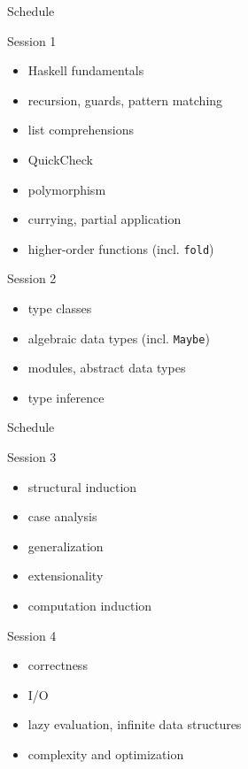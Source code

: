 \documentclass{beamer}
\def\code#1{\texttt{#1}}
\begin{document}
\begin{frame}{Schedule}

\begin{block}{Session 1}
\begin{itemize}
    \item Haskell fundamentals
    \item recursion, guards, pattern matching
    \item list comprehensions
    \item QuickCheck
    \item polymorphism
    \item currying, partial application
    \item higher-order functions (incl. \code{fold})
\end{itemize}
\end{block}

\begin{block}{Session 2}
\begin{itemize}
    \item type classes
    \item algebraic data types (incl. \code{Maybe})
    \item modules, abstract data types
    \item type inference
\end{itemize}
\end{block}

\end{frame}

\begin{frame}{Schedule}

\begin{block}{Session 3}
\begin{itemize}
    \item structural induction
    \item case analysis
    \item generalization
    \item extensionality
    \item computation induction
\end{itemize}
\end{block}

\begin{block}{Session 4}
\begin{itemize}
    \item correctness
    \item I/O
    \item lazy evaluation, infinite data structures
    \item complexity and optimization
\end{itemize}
\end{block}

\end{frame}
\end{document}
